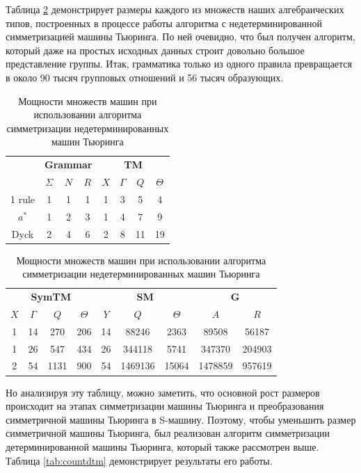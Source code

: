\documentclass[14pt]{matmex-diploma-custom}
\begin{document}
Таблица \ref{tab:countndtm} демонстрирует размеры каждого из множеств наших алгебраических типов, построенных в процессе работы алгоритма с недетерминированной симметризацией машины Тьюринга. По ней очевидно, что был получен алгоритм, который даже на простых исходных данных строит довольно большое представление группы. Итак, грамматика только из одного правила превращается в около 90 тысяч групповых отношений и 56 тысяч образующих. 

\begin{table}[H]
\centering
\begin{tabular}{|c|
c|c|c|
c|c|c|c|}
\hline
&
\multicolumn{3}{|c|}{\textbf{Grammar}}&
\multicolumn{4}{|c|}{\textbf{TM}}\\
\cline{2-8}
&$\Sigma$&$N$&$R$
&$X$&$\Gamma$&$Q$&$\Theta$\\
\hline
1 rule
&1&1&1
&1&3&5&4\\
\hline
$a^*$
&1&2&3
&1&4&7&9\\
\hline
Dyck
&2&4&6
&2&8&11&19\\
\hline
\end{tabular}
\begin{tabular}{
|c|c|c|c|
c|c|c|
c|c|}
\hline
\multicolumn{4}{|c|}{\textbf{SymTM}}&
\multicolumn{3}{|c|}{\textbf{SM}}&
\multicolumn{2}{|c|}{\textbf{G}}\\
\cline{1-9}
$X$&$\Gamma$&$Q$&$\Theta$
&$Y$&$Q$&$\Theta$
&$A$&$R$\\
\hline
1&14&270&206
&14&88246&2363
&89508&56187\\
\hline
1&26&547&434
&26&344118&5741
&347370&204903\\
\hline
2&54&1131&900
&54&1469136&15064
&1478859&957619\\
\hline
\end{tabular}
\caption{Мощности множеств машин при использовании алгоритма симметризации недетерминированных машин Тьюринга}
\label{tab:countndtm}
\end{table}


Но анализируя эту таблицу, можно заметить, что основной рост размеров происходит на этапах симметризации машины Тьюринга и преобразования симметричной машины Тьюринга в S-машину. Поэтому, чтобы уменьшить размер симметричной машины Тьюринга, был реализован алгоритм симметризации детерминированной машины Тьюринга, который также рассмотрен выше. Таблица \ref{tab:countdtm} демонстрирует результаты его работы. 
\end{document}
